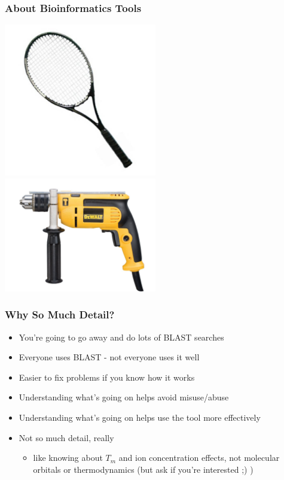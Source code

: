 \begin{frame}
  \frametitle{About Bioinformatics Tools}
  \begin{center}
    \includegraphics[width=0.5\textwidth]{images/racquet} 
    \includegraphics[width=0.5\textwidth]{images/drill}       
  \end{center}
\end{frame}      

\begin{frame}
  \frametitle{Why So Much Detail?}
  \begin{itemize}
    \item You're going to go away and do lots of BLAST searches
    \item Everyone uses BLAST - not everyone uses it well
    \item Easier to fix problems if you know how it works
    \item Understanding what's going on helps avoid misuse/abuse
    \item Understanding what's going on helps use the tool more effectively
    \item Not so much detail, really
    \begin{itemize}
      \item like knowing about $T_m$ and ion concentration effects, not molecular 
               orbitals or thermodynamics (but ask if you're interested ;) )
    \end{itemize}
  \end{itemize}
\end{frame}      

